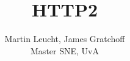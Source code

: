 \documentclass{article}
\begin{document}
 
\begin{figure}[!bh]
 	\begin{center}
		\huge \title{HTTP2}
		\author{ Martin Leucht, James Gratchoff \\
		Master SNE, UvA} 
	\maketitle 
		\label{sec:uva}
	\end{center}
\end{figure}
\setlength{\columnsep}{2cm}
\def\columnseprulecolor{\color{blue}}
 
\begin{multicols}{2}








\begin{thebibliography}
\\
\end{thebibliography}
\newpage
\appendix

\end{multicols}
\end{document}
